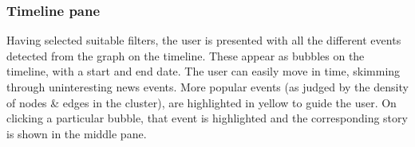 \subsubsection*{Timeline pane}
Having selected suitable filters, the user is presented with all the different events detected from the graph on the timeline. These appear as 
bubbles on the timeline, with a start and end date. The user can easily move in time, skimming through uninteresting news events.
More popular events (as judged by the density of nodes \& edges in the cluster), are highlighted in yellow to guide the user.
On clicking a particular bubble, that event is highlighted and the corresponding story is shown in the middle pane.
